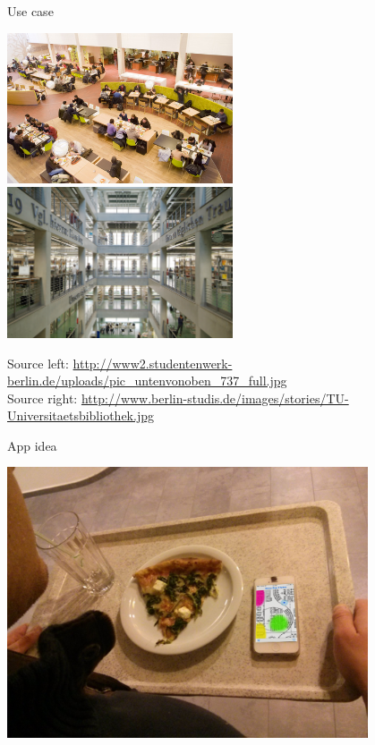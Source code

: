 \documentclass[11pt]{beamer}
\begin{document}
\begin{frame}{Use case}

	\vspace{1cm}

    \begin{center}

      \includegraphics[width=0.5\textwidth]{mensa}
      \includegraphics[width=0.5\textwidth]{Bibliothek}

    \end{center}

	\vspace{1cm}

  \tiny{Source left: \url{http://www2.studentenwerk-berlin.de/uploads/pic_untenvonoben_737_full.jpg}}\\
  \tiny{Source right: \url{http://www.berlin-studis.de/images/stories/TU-Universitaetsbibliothek.jpg}}

\end{frame}


\begin{frame}{App idea}

  \begin{center}

    \vspace*{-14pt}\includegraphics[width=0.8\textwidth]{navitablet}

  \end{center}

\end{frame}
\end{document}
